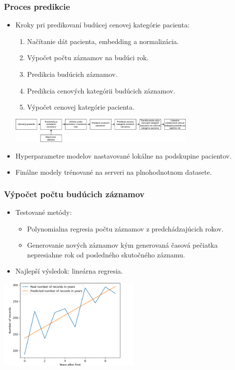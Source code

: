 \documentclass[slovak,10pt]{beamer}
\begin{document}
\begin{frame}
	\frametitle{Proces predikcie}
	\begin{itemize}
		\item<1> Kroky pri predikovaní budúcej cenovej kategórie pacienta:
		\begin{enumerate}
			\item<1> Načítanie dát pacienta, embedding a normalizácia.
			\item<1> Výpočet počtu záznamov na budúci rok.
			\item<1> Predikcia budúcich záznamov.
			\item<1> Predikcia cenových kategórii budúcich záznamov.
			\item<1> Výpočet cenovej kategórie pacienta.
		\end{enumerate}
		\includegraphics[height=1.25cm]{images/system_flow.png}
		\item<1> Hyperparametre modelov nastavované lokálne na podskupine pacientov.
		\item<1> Finálne modely trénované na serveri na plnohodnotnom datasete.
	\end{itemize}
\end{frame}

\begin{frame}
	\frametitle{Výpočet počtu budúcich záznamov}
	\begin{itemize}
		\item<1> Testované metódy:
		\begin{itemize}
			\item<1> Polynomialna regresia počtu záznamov z predchádzajúcich rokov.
			\item<1> Generovanie nových záznamov kým generovaná časová pečiatka nepresiahne rok od posledného skutočného záznamu.
		\end{itemize}
		\item<1> Najlepší výsledok: lineárna regresia.
	\end{itemize}
	\begin{center}
		\includegraphics[height=4.5cm]{images/num_of_rec.png}
	\end{center}
\end{frame}
\end{document}
